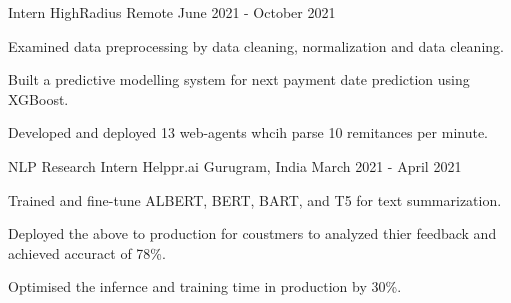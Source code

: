 \begin{cventries}
  \cventry
    {Intern} %
    {HighRadius} %
    {Remote} %
    {June 2021 - October 2021} %
    {
      \begin{cvitems} %
        \item {Examined data preprocessing by data cleaning, normalization and data cleaning.}
        \item {Built a predictive modelling system for next payment date prediction using XGBoost.}
        \item {Developed and deployed 13 web-agents whcih parse 10 remitances per minute.}
      \end{cvitems}
    }


  \cventry
    {NLP Research Intern} %
    {Helppr.ai} %
    {Gurugram, India} %
    {March 2021 - April 2021} %
    {
      \begin{cvitems} %
        \item {Trained and fine-tune ALBERT, BERT, BART, and T5 for text summarization.}
        \item {Deployed the above to production for coustmers to analyzed thier feedback and achieved accuract of 78\%.}
        \item {Optimised the infernce and training time in production by 30\%.}
      \end{cvitems}
    }

\end{cventries}
